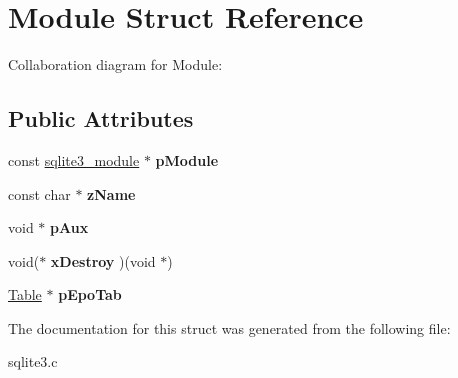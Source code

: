 \hypertarget{structModule}{}\section{Module Struct Reference}
\label{structModule}


Collaboration diagram for Module\+:
\subsection*{Public Attributes}
\begin{DoxyCompactItemize}
\item 
const \hyperlink{structsqlite3__module}{sqlite3\+\_\+module} $\ast$ {\bfseries p\+Module}\hypertarget{structModule_a65d2539d71ea028b505b2fb33563bfd7}{}\label{structModule_a65d2539d71ea028b505b2fb33563bfd7}

\item 
const char $\ast$ {\bfseries z\+Name}\hypertarget{structModule_a45a5f5b43926b8ebf3e13e46a6534810}{}\label{structModule_a45a5f5b43926b8ebf3e13e46a6534810}

\item 
void $\ast$ {\bfseries p\+Aux}\hypertarget{structModule_ae3b827fee4c8b4f3ff38c86c2e2f48cd}{}\label{structModule_ae3b827fee4c8b4f3ff38c86c2e2f48cd}

\item 
void($\ast$ {\bfseries x\+Destroy} )(void $\ast$)\hypertarget{structModule_a4a4b707d6ad852cf2e8d983d22886cc1}{}\label{structModule_a4a4b707d6ad852cf2e8d983d22886cc1}

\item 
\hyperlink{structTable}{Table} $\ast$ {\bfseries p\+Epo\+Tab}\hypertarget{structModule_a546d1d825743f3083e7413f9f280d402}{}\label{structModule_a546d1d825743f3083e7413f9f280d402}

\end{DoxyCompactItemize}


The documentation for this struct was generated from the following file\+:\begin{DoxyCompactItemize}
\item 
sqlite3.\+c\end{DoxyCompactItemize}
